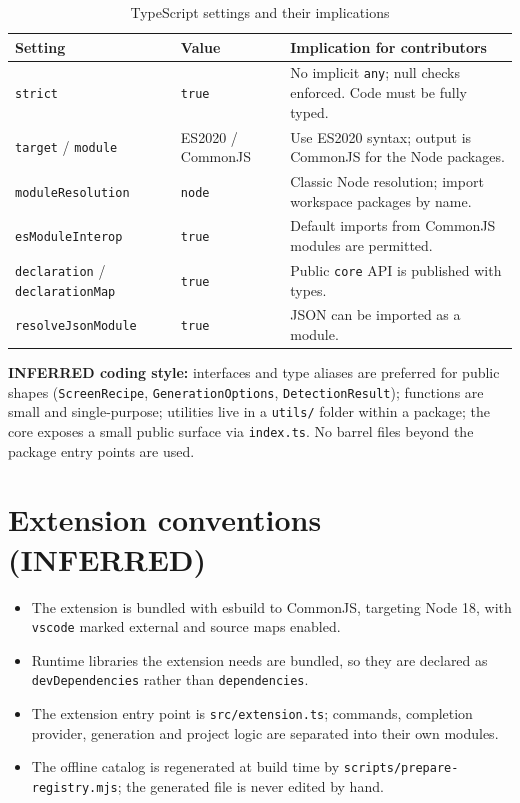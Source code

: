 \begin{longtable}{p{4.4cm}p{2.6cm}p{7.2cm}}
\caption{TypeScript settings and their implications}\\
\toprule
\textbf{Setting} & \textbf{Value} & \textbf{Implication for contributors} \\
\midrule

\texttt{strict} & \texttt{true} & No implicit \texttt{any}; null checks enforced.
Code must be fully typed. \\
\texttt{target} / \texttt{module} & ES2020 / CommonJS & Use ES2020 syntax; output is
CommonJS for the Node packages. \\
\texttt{moduleResolution} & \texttt{node} & Classic Node resolution; import
workspace packages by name. \\
\texttt{esModuleInterop} & \texttt{true} & Default imports from CommonJS modules
are permitted. \\
\texttt{declaration} / \texttt{declarationMap} & \texttt{true} & Public
\texttt{core} API is published with types. \\
\texttt{resolveJsonModule} & \texttt{true} & JSON can be imported as a module. \\
\bottomrule
\end{longtable}

\textbf{INFERRED coding style:} interfaces and type aliases are preferred for
public shapes (\texttt{ScreenRecipe}, \texttt{GenerationOptions},
\texttt{DetectionResult}); functions are small and single-purpose; utilities live
in a \texttt{utils/} folder within a package; the core exposes a small public
surface via \texttt{index.ts}. No barrel files beyond the package entry points
are used.

\section{Extension conventions (INFERRED)}

\begin{itemize}
  \item The extension is bundled with esbuild to CommonJS, targeting Node 18,
        with \texttt{vscode} marked external and source maps enabled.
  \item Runtime libraries the extension needs are bundled, so they are declared
        as \texttt{devDependencies} rather than \texttt{dependencies}.
  \item The extension entry point is \texttt{src/extension.ts}; commands,
        completion provider, generation and project logic are separated into
        their own modules.
  \item The offline catalog is regenerated at build time by
        \texttt{scripts/prepare-registry.mjs}; the generated file is never edited
        by hand.
\end{itemize}

